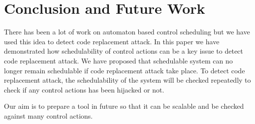 \section{Conclusion and Future Work} \label{sec7}
\noindent
There has been a lot of work on automaton based control scheduling but we have 
used this idea to detect code replacement attack. In this paper we have demonstrated
how schedulability of control actions can be a key issue to detect code replacement attack.
We have proposed that  schedulable system can no longer remain schedulable if code 
replacement attack take place. To detect code replacement attack, the schedulability of 
the system will be checked repeatedly to check if any control actions has been hijacked or not.

Our aim is to prepare a tool in future so that it can be scalable and  be checked against many
control actions. 
